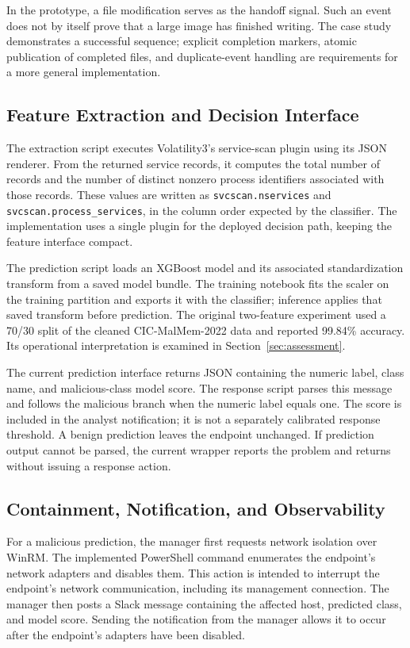 \documentclass[conference]{IEEEtran}
\begin{document}
In the prototype, a file modification serves as the handoff signal. Such an event does not by itself prove that a large image has finished writing. The case study demonstrates a successful sequence; explicit completion markers, atomic publication of completed files, and duplicate-event handling are requirements for a more general implementation.

\subsection{Feature Extraction and Decision Interface}
The extraction script executes Volatility3's service-scan plugin using its JSON renderer. From the returned service records, it computes the total number of records and the number of distinct nonzero process identifiers associated with those records. These values are written as \texttt{svcscan.nservices} and \texttt{svcscan.process\_services}, in the column order expected by the classifier. The implementation uses a single plugin for the deployed decision path, keeping the feature interface compact.

The prediction script loads an XGBoost model and its associated standardization transform from a saved model bundle. The training notebook fits the scaler on the training partition and exports it with the classifier; inference applies that saved transform before prediction. The original two-feature experiment used a 70/30 split of the cleaned CIC-MalMem-2022 data and reported 99.84\% accuracy. Its operational interpretation is examined in Section~\ref{sec:assessment}.

The current prediction interface returns JSON containing the numeric label, class name, and malicious-class model score. The response script parses this message and follows the malicious branch when the numeric label equals one. The score is included in the analyst notification; it is not a separately calibrated response threshold. A benign prediction leaves the endpoint unchanged. If prediction output cannot be parsed, the current wrapper reports the problem and returns without issuing a response action.

\subsection{Containment, Notification, and Observability}
For a malicious prediction, the manager first requests network isolation over WinRM. The implemented PowerShell command enumerates the endpoint's network adapters and disables them. This action is intended to interrupt the endpoint's network communication, including its management connection. The manager then posts a Slack message containing the affected host, predicted class, and model score. Sending the notification from the manager allows it to occur after the endpoint's adapters have been disabled.
\end{document}
